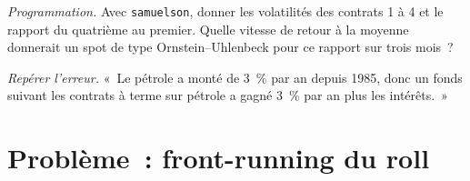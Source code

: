 \begin{exercise}[$\star\star\star$]\label{exo:m3:forward-curves-storage-and-convenience-yield:7}
\emph{Programmation.} Avec \texttt{samuelson}, donner les volatilités des contrats 1 à 4 et le rapport du
quatrième au premier. Quelle vitesse de retour à la moyenne donnerait un spot de type Ornstein--Uhlenbeck pour ce rapport
sur trois mois~?
\end{exercise}

\begin{exercise}[$\star\star\star$]\label{exo:m3:forward-curves-storage-and-convenience-yield:8}
\emph{Repérer l'erreur.} «~Le pétrole a monté de 3~\% par an depuis 1985, donc un fonds suivant les contrats à terme sur pétrole a gagné
3~\% par an plus les intérêts.~»
\end{exercise}

\section{Problème~: front-running du roll}

